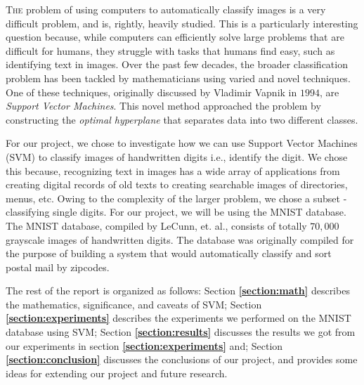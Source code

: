 
\lettrine[nindent=0em,lines=2]{T}{he} problem of using computers to automatically classify images is a very difficult problem, and is, rightly, heavily studied. This is a particularly interesting question because, while computers can efficiently solve large problems that are difficult for humans, they struggle with tasks that humans find easy, such as identifying text in images. Over the past few decades, the broader classification problem has been tackled by mathematicians using varied and novel techniques. One of these techniques, originally discussed by Vladimir Vapnik in $1994$, are \textit{Support Vector Machines}\cite{statistical-learning}. This novel method approached the problem by constructing the \textit{optimal hyperplane} that separates data into two different classes.

For our project, we chose to investigate how we can use Support Vector Machines (SVM) to classify images of handwritten digits i.e., identify the digit. We chose this because, recognizing text in images has a wide array of applications from creating digital records of old texts to creating searchable images of directories, menus, etc. Owing to the complexity of the larger problem, we chose a subset - classifying single digits. For our project, we will be using the MNIST database\cite{mnist}. The MNIST database, compiled by LeCunn, et. al., consists of totally $70,000$ grayscale images of handwritten digits. The database was originally compiled for the purpose of building a system that would automatically classify and sort postal mail by zipcodes.

The rest of the report is organized as follows: Section \textbf{\ref{section:math}} describes the mathematics, significance, and caveats of SVM; Section \textbf{\ref{section:experiments}} describes the experiments we performed on the MNIST database using SVM; Section \textbf{\ref{section:results}} discusses the results we got from our experiments in section \textbf{\ref{section:experiments}} and; Section \textbf{\ref{section:conclusion}} discusses the conclusions of our project, and provides some ideas for extending our project and future research.